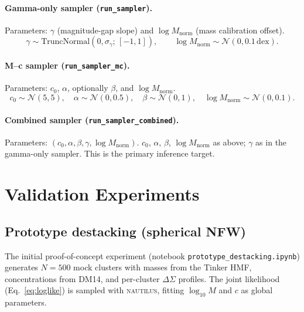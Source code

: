 \documentclass[12pt,a4paper]{article}
\begin{document}
\paragraph{Gamma-only sampler (\texttt{run\_sampler}).}
Parameters: $\gamma$ (magnitude-gap slope) and $\log M_\mathrm{norm}$ (mass calibration offset).
\begin{equation}
  \gamma \sim \mathrm{TruncNormal}(0, \sigma_\gamma;\, [-1, 1]),
  \qquad
  \log M_\mathrm{norm} \sim \mathcal{N}(0, 0.1\,\mathrm{dex}).
\end{equation}

\paragraph{M--c sampler (\texttt{run\_sampler\_mc}).}
Parameters: $c_0$, $\alpha$, optionally $\beta$, and $\log M_\mathrm{norm}$.
\begin{equation}
  c_0 \sim \mathcal{N}(5, 5),\quad
  \alpha \sim \mathcal{N}(0, 0.5),\quad
  \beta \sim \mathcal{N}(0, 1),\quad
  \log M_\mathrm{norm} \sim \mathcal{N}(0, 0.1).
\end{equation}

\paragraph{Combined sampler (\texttt{run\_sampler\_combined}).}
Parameters: $(c_0, \alpha, \beta, \gamma, \log M_\mathrm{norm})$.
$c_0$, $\alpha$, $\beta$, $\log M_\mathrm{norm}$ as above; $\gamma$ as in the
gamma-only sampler.  This is the primary inference target.

\section{Validation Experiments}
\label{sec:validation}

\subsection{Prototype destacking (spherical NFW)}

The initial proof-of-concept experiment (notebook
\texttt{prototype\_destacking.ipynb}) generates $N=500$ mock clusters with
masses from the Tinker HMF, concentrations from DM14, and per-cluster
$\Delta\Sigma$ profiles.  The joint likelihood (Eq.~\ref{eq:loglike}) is
sampled with \textsc{nautilus}, fitting $\log_{10}M$ and $c$ as global
parameters.
\end{document}
